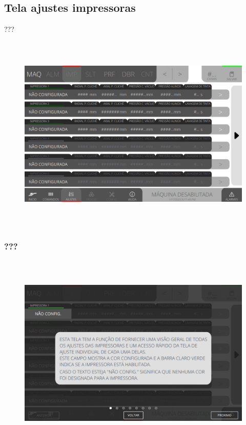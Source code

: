 \thispagestyle{fancy}
\vspace*{\fill}
\subsection{Tela ajustes impressoras}
 ???
\begin{figure}[h]
  \centering
  \includegraphics[width=576px,height=360px]{src/imagesFlexo/04-printter/01-printters/settings/e-Tela-Principal.png}
   \label{}
\end{figure}

\newpage
\thispagestyle{fancy}
\vspace*{\fill}
\subsubsection{\small{???}}
\begin{figure}[h]
  \centering
  \includegraphics[width=576px,height=360px]{src/imagesFlexo/04-printter/01-printters/settings/e-1.png}
   \label{}
\end{figure}
\vspace*{\fill}

